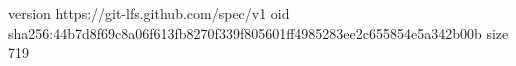 version https://git-lfs.github.com/spec/v1
oid sha256:44b7d8f69c8a06f613fb8270f339f805601ff4985283ee2c655854e5a342b00b
size 719
